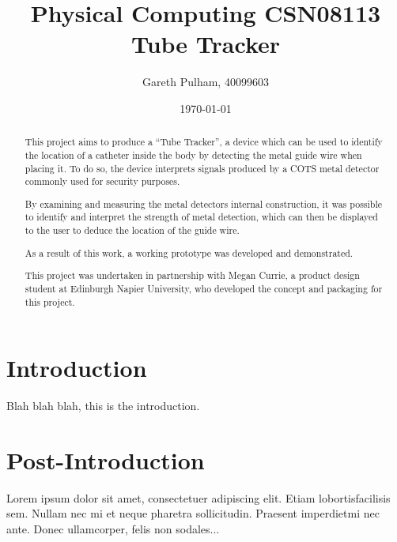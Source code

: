 \documentclass[a4paper]{article}
\begin{document}
\begin{titlepage}
\title{Physical Computing CSN08113\\
	Tube Tracker
}
\author{Gareth Pulham, 40099603}
\date{\today}
\maketitle
\thispagestyle{empty}

\begin{abstract}
This project aims to produce a “Tube Tracker”, a device which can be used to identify the location of a catheter inside the body by detecting the metal guide wire when placing it. To do so, the device interprets signals produced by a COTS metal detector commonly used for security purposes.

By examining and measuring the metal detectors internal construction, it was possible to identify and interpret the strength of metal detection, which can then be displayed to the user to deduce the location of the guide wire.

As a result of this work, a working prototype was developed and demonstrated.

This project was undertaken in partnership with Megan Currie, a product design student at Edinburgh Napier University, who developed the concept and packaging for this project.
\end{abstract}
\end{titlepage}

\tableofcontents

\section{Introduction}
Blah blah blah, this is the introduction.

\section{Post-Introduction}
Lorem  ipsum  dolor  sit  amet,  consectetuer  adipiscing  
elit.   Etiam  lobortisfacilisis sem.  Nullam nec mi et 
neque pharetra sollicitudin.  Praesent imperdietmi nec ante. 
Donec ullamcorper, felis non sodales...
\end{document}
